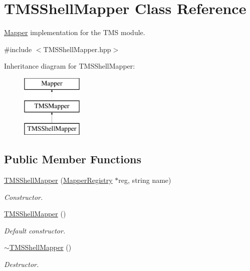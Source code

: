 \hypertarget{classTMSShellMapper}{
\section{TMSShellMapper Class Reference}
\label{classTMSShellMapper}
}


\hyperlink{classMapper}{Mapper} implementation for the TMS module.  




{\ttfamily \#include $<$TMSShellMapper.hpp$>$}

Inheritance diagram for TMSShellMapper:\begin{figure}[H]
\begin{center}
\leavevmode
\includegraphics[height=3.000000cm]{classTMSShellMapper}
\end{center}
\end{figure}
\subsection*{Public Member Functions}
\begin{DoxyCompactItemize}
\item 
\hyperlink{classTMSShellMapper_a0aaf01c8fe3dc19c01d768b9707101dd}{TMSShellMapper} (\hyperlink{classMapperRegistry}{MapperRegistry} $\ast$reg, string name)
\begin{DoxyCompactList}\small\item\em Constructor. \item\end{DoxyCompactList}\item 
\hypertarget{classTMSShellMapper_a38484fad1a432dad2f2a8d4c900819c0}{
\hyperlink{classTMSShellMapper_a38484fad1a432dad2f2a8d4c900819c0}{TMSShellMapper} ()}
\label{classTMSShellMapper_a38484fad1a432dad2f2a8d4c900819c0}

\begin{DoxyCompactList}\small\item\em Default constructor. \item\end{DoxyCompactList}\item 
\hypertarget{classTMSShellMapper_a94137cc251425d8416160e4cd5a66f80}{
\hyperlink{classTMSShellMapper_a94137cc251425d8416160e4cd5a66f80}{$\sim$TMSShellMapper} ()}
\label{classTMSShellMapper_a94137cc251425d8416160e4cd5a66f80}

\begin{DoxyCompactList}\small\item\em Destructor. \item\end{DoxyCompactList}\end{DoxyCompactItemize}


